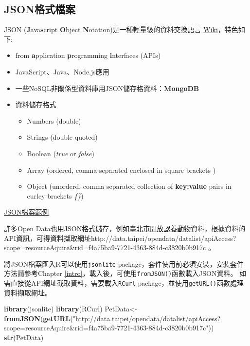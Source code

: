 \documentclass[]{book}
\newenvironment{Shaded}{\begin{snugshade}}{\end{snugshade}}
\newcommand{\KeywordTok}[1]{\textcolor[rgb]{0.13,0.29,0.53}{\textbf{{#1}}}}
\newcommand{\StringTok}[1]{\textcolor[rgb]{0.31,0.60,0.02}{{#1}}}
\newcommand{\NormalTok}[1]{{#1}}
\providecommand{\tightlist}{%
  \setlength{\itemsep}{0pt}\setlength{\parskip}{0pt}}
\theoremstyle{definition}
\theoremstyle{definition}
\theoremstyle{remark}
\begin{document}
\subsection{JSON格式檔案}\label{json}

JSON (\textbf{J}ava\textbf{s}cript \textbf{O}bject
\textbf{N}otation)是一種輕量級的資料交換語言
\href{http://en.wikipedia.org/wiki/JSON}{Wiki}，特色如下:

\begin{itemize}
\tightlist
\item
  from \textbf{a}pplication \textbf{p}rogramming \textbf{i}nterfaces
  (APIs)
\item
  JavaScript、Java、Node.js應用
\item
  一些NoSQL非關係型資料庫用JSON儲存格資料：\textbf{MongoDB}
\item
  資料儲存格式

  \begin{itemize}
  \tightlist
  \item
    Numbers (double)
  \item
    Strings (double quoted)
  \item
    Boolean (\emph{true} or \emph{false})
  \item
    Array (ordered, comma separated enclosed in square brackets
    \emph{\protect\hyperlink{preface}{}})
  \item
    Object (unorderd, comma separated collection of \textbf{key:value}
    pairs in curley brackets \emph{\{\}})
  \end{itemize}
\end{itemize}

\href{https://api.github.com/users/yijutseng/repos}{JSON檔案範例}

許多Open
Data也用JSON格式儲存，例如\href{http://data.taipei/opendata/datalist/datasetMeta?oid=6a3e862a-e1cb-4e44-b989-d35609559463}{臺北市開放認養動物}資料，根據資料的API資訊，可得資料擷取網址http://data.taipei/opendata/datalist/apiAccess?scope=resourceAquire\&rid=f4a75ba9-7721-4363-884d-c3820b0b917c
。

將JSON檔案匯入R可以使用\texttt{jsonlite}\citep{R-jsonlite}
package，套件使用前必須安裝，安裝套件方法請參考Chapter
\ref{intro}，載入後，可使用\texttt{fromJSON()}函數載入JSON資料。
如需直接從API網址截取資料，需要載入\texttt{RCurl}\citep{R-RCurl}
package，並使用\texttt{getURL()}函數處理資料擷取網址。

\begin{Shaded}
\begin{Highlighting}[]
\KeywordTok{library}\NormalTok{(jsonlite)}
\KeywordTok{library}\NormalTok{(RCurl)}
\NormalTok{PetData<-}\KeywordTok{fromJSON}\NormalTok{(}\KeywordTok{getURL}\NormalTok{(}\StringTok{"http://data.taipei/opendata/datalist/apiAccess?scope=resourceAquire&rid=f4a75ba9-7721-4363-884d-c3820b0b917c"}\NormalTok{))}
\KeywordTok{str}\NormalTok{(PetData)}
\end{Highlighting}
\end{Shaded}
\end{document}

